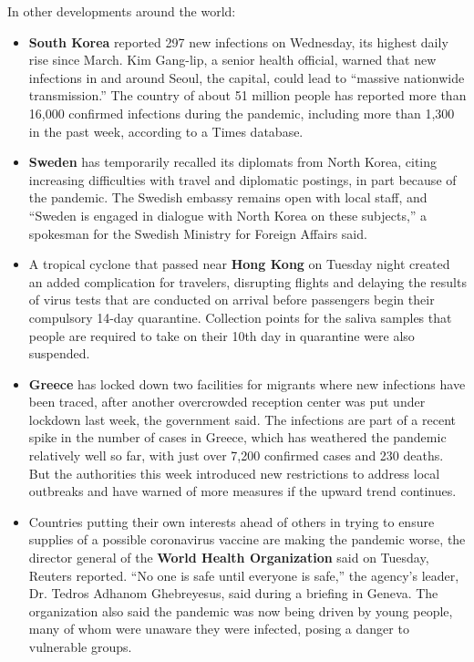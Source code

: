 In other developments around the world:

\begin{itemize}
\item
  \textbf{South Korea} reported 297 new infections on Wednesday, its
  highest daily rise since March. Kim Gang-lip, a senior health
  official, warned that new infections in and around Seoul, the capital,
  could lead to ``massive nationwide transmission.'' The country of
  about 51 million people has reported more than 16,000 confirmed
  infections during the pandemic, including more than 1,300 in the past
  week, according to a Times database.
\item
  \textbf{Sweden} has temporarily recalled its diplomats from North
  Korea, citing increasing difficulties with travel and diplomatic
  postings, in part because of the pandemic. The Swedish embassy remains
  open with local staff, and ``Sweden is engaged in dialogue with North
  Korea on these subjects,'' a spokesman for the Swedish Ministry for
  Foreign Affairs said.
\item
  A tropical cyclone that passed near \textbf{Hong Kong} on Tuesday
  night created an added complication for travelers, disrupting flights
  and delaying the results of virus tests that are conducted on arrival
  before passengers begin their compulsory 14-day quarantine. Collection
  points for the saliva samples that people are required to take on
  their 10th day in quarantine were also suspended.
\item
  \textbf{Greece} has locked down two facilities for migrants where new
  infections have been traced, after another overcrowded reception
  center was put under lockdown last week, the government said. The
  infections are part of a recent spike in the number of cases in
  Greece, which has weathered the pandemic relatively well so far, with
  just over 7,200 confirmed cases and 230 deaths. But the authorities
  this week introduced new restrictions to address local outbreaks and
  have warned of more measures if the upward trend continues.
\item
  Countries putting their own interests ahead of others in trying to
  ensure supplies of a possible coronavirus vaccine are making the
  pandemic worse, the director general of the \textbf{World Health
  Organization} said on Tuesday, Reuters reported. ``No one is safe
  until everyone is safe,'' the agency's leader, Dr. Tedros Adhanom
  Ghebreyesus, said during a briefing in Geneva. The organization also
  said the pandemic was now being driven by young people, many of whom
  were unaware they were infected, posing a danger to vulnerable groups.
\end{itemize}

